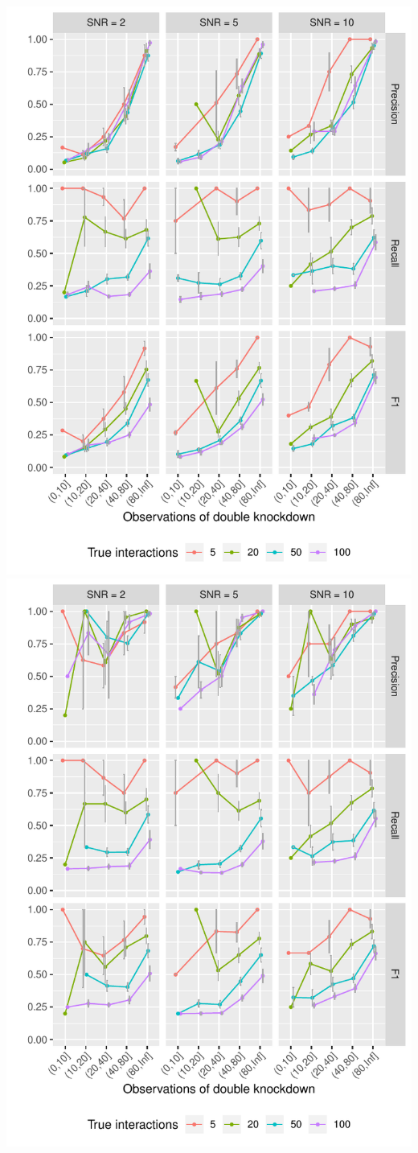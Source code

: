 \begin{minipage}{\linewidth}
	\centering
	\includegraphics[width=0.5\linewidth]{"output/NumObservations_n1000_tno"}%
	\includegraphics[width=0.5\linewidth]{"output/NumObservations_n1000_tyes"}
\end{minipage}
